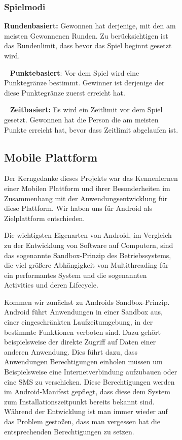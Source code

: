 \documentclass{scrartcl}
\begin{document}
\begin{figure}[!ht]
\begin{figure}[!ht]
\subsubsection{Spielmodi}

\textbf{Rundenbasiert:}
Gewonnen hat derjenige, mit den am meisten Gewonnenen Runden. Zu berücksichtigen
ist das Rundenlimit, dass bevor das Spiel beginnt gesetzt wird.

\ \newline
\textbf{Punktebasiert}:
Vor dem Spiel wird eine Punktegränze bestimmt. Gewinner ist derjenige der diese
Punktegränze zuerst erreicht hat.

\ \newline
\textbf{Zeitbasiert:}
Es wird ein Zeitlimit vor dem Spiel gesetzt. Gewonnen hat die Person die 
am meisten Punkte erreicht hat, bevor dass Zeitlimit abgelaufen ist.

\subsection{Mobile Plattform}
Der Kerngedanke dieses Projekts war das Kennenlernen einer Mobilen Plattform und ihrer Besonderheiten im Zusammenhang mit der Anwendungsentwicklung für diese Plattform.
Wir haben uns für Android als Zielplattform entschieden.

Die wichtigsten Eigenarten von Android, im Vergleich zu der Entwicklung von Software auf Computern, sind das sogenannte Sandbox-Prinzip des Betriebssystems, die viel größere Abhängigkeit von Multithreading für ein performantes System und die sogenannten Activities und deren Lifecycle.

Kommen wir zunächst zu Androids Sandbox-Prinzip. Android führt Anwendungen in einer Sandbox aus, einer eingeschränkten Laufzeitumgebung, in der bestimmte Funktionen verboten sind. Dazu gehört beispielsweise der direkte Zugriff auf Daten einer anderen Anwendung. Dies führt dazu, dass Anwendungen Berechtigungen einholen müssen um Beispielsweise eine Internetverbindung aufzubauen oder eine SMS zu verschicken. Diese Berechtigungen werden im Android-Manifest gepflegt, dass diese dem System zum Installationszeitpunkt bereits bekannt sind. Während der Entwicklung ist man immer wieder auf das Problem gestoßen, dass man vergessen hat die entsprechenden Berechtigungen zu setzen.


\end{figure}
\end{figure}
\end{document}
